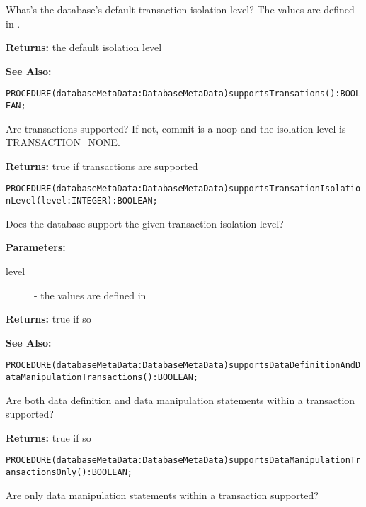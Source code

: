 What's the database's default transaction isolation level? The values are defined in . 


{\bf Returns: } 
the default isolation level 

{\bf See Also:} 




\verb'PROCEDURE(databaseMetaData:DatabaseMetaData)supportsTransations():BOOLEAN;'






Are transactions supported? If not, commit is a noop and the isolation level is TRANSACTION\_NONE. 


{\bf Returns: } 
true if transactions are supported 




\verb'PROCEDURE(databaseMetaData:DatabaseMetaData)supportsTransationIsolationLevel(level:INTEGER):BOOLEAN;'






Does the database support the given transaction isolation level? 


{\bf Parameters: }
\begin{description}
\item[level] - the values are defined in  
\end{description}

{\bf Returns: } 
true if so 

{\bf See Also:} 




\verb'PROCEDURE(databaseMetaData:DatabaseMetaData)supportsDataDefinitionAndDataManipulationTransactions():BOOLEAN;'






Are both data definition and data manipulation statements within a transaction supported? 


{\bf Returns: } 
true if so 




\verb'PROCEDURE(databaseMetaData:DatabaseMetaData)supportsDataManipulationTransactionsOnly():BOOLEAN;'






Are only data manipulation statements within a transaction supported? 


